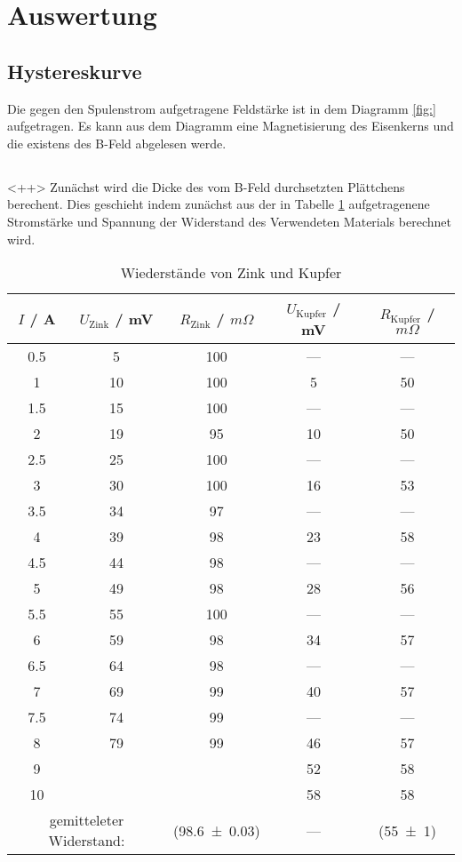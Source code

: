 \section{Auswertung}
\label{sec:Auswertung}
\subsection{Hystereskurve}
Die gegen den Spulenstrom aufgetragene Feldstärke ist in dem Diagramm \ref{fig:} aufgetragen. Es kann aus dem Diagramm eine Magnetisierung des Eisenkerns und die existens des B-Feld abgelesen werde.

\subsection{}<++>
Zunächst wird die Dicke des vom B-Feld durchsetzten Plättchens berechent. Dies geschieht indem zunächst aus der in Tabelle \ref{tab:RZK} aufgetragenene Stromstärke und Spannung der Widerstand des Verwendeten Materials berechnet wird.
\begin{table}
  \centering
  \begin{tabular}{c|c c|c c}
    \toprule
    $I$ / A & $U_\text{Zink}$ / mV & $R_\text{Zink}$ / $m\Omega$ & $U_\text{Kupfer}$ / mV & $R_\text{Kupfer}$ / $m\Omega$ \\
    \midrule
	0.5	& 5	& 100	& ---	& ---	\\
	1	& 10	& 100	& 5	& 50	\\
	1.5	& 15	& 100	& ---	& ---	\\
	2	& 19	& 95	& 10	& 50	\\
	2.5	& 25	& 100	& ---	& ---	\\
	3	& 30	& 100	& 16 	& 53	\\
	3.5	& 34	& 97	& ---	& ---	\\
	4	& 39	& 98	& 23	& 58	\\
	4.5	& 44	& 98	& ---	& ---	\\
	5	& 49	& 98	& 28	& 56	\\
	5.5	& 55	& 100	& ---	& ---	\\
	6	& 59	& 98	& 34	& 57	\\
	6.5	& 64	& 98	& ---	& ---	\\
	7	& 69	& 99	& 40  	& 57	\\
	7.5	& 74	& 99	& ---	& ---	\\
	8	& 79	& 99	& 46	& 57	\\	
	9	&	&	& 52	& 58	\\
	10	&	&	& 58	& 58	\\
    \midrule
    \multicolumn{2}{c}{gemitteleter Widerstand:}& (\num{98.6 +- 0.03}) & --- & (\num{55 +- 1}) \\
    \bottomrule
  \end{tabular}
  \caption{Wiederstände von Zink und Kupfer}
  \label{tab:RZK}
\end{table} 
